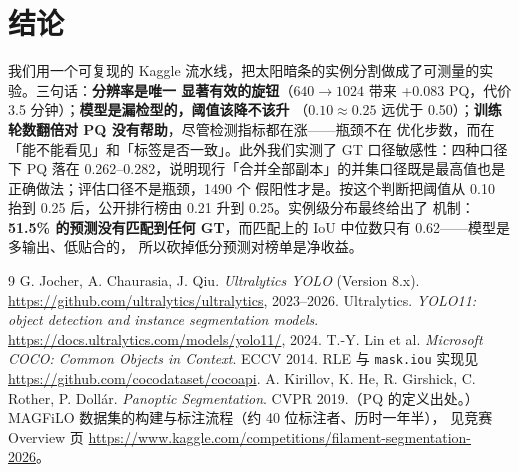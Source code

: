 \documentclass{article}
\begin{document}
\section{结论}
我们用一个可复现的 Kaggle 流水线，把太阳暗条的实例分割做成了可测量的实验。三句话：\textbf{分辨率是唯一
显著有效的旋钮}（$640\to1024$ 带来 +0.083 PQ，代价 3.5 分钟）；\textbf{模型是漏检型的，阈值该降不该升}
（$0.10\approx0.25$ 远优于 0.50）；\textbf{训练轮数翻倍对 PQ 没有帮助}，尽管检测指标都在涨——瓶颈不在
优化步数，而在「能不能看见」和「标签是否一致」。此外我们实测了 GT 口径敏感性：四种口径下 PQ 落在
0.262--0.282，说明现行「合并全部副本」的并集口径既是最高值也是正确做法；评估口径不是瓶颈，1490 个
假阳性才是。按这个判断把阈值从 0.10 抬到 0.25 后，公开排行榜由 0.21 升到 0.25。实例级分布最终给出了
机制：\textbf{51.5\% 的预测没有匹配到任何 GT}，而匹配上的 IoU 中位数只有 0.62——模型是多输出、低贴合的，
所以砍掉低分预测对榜单是净收益。

\begin{thebibliography}{9}
 G. Jocher, A. Chaurasia, J. Qiu. \emph{Ultralytics YOLO} (Version 8.x).
  \url{https://github.com/ultralytics/ultralytics}, 2023--2026.
 Ultralytics. \emph{YOLO11: object detection and instance segmentation models}.
  \url{https://docs.ultralytics.com/models/yolo11/}, 2024.
 T.-Y. Lin et al. \emph{Microsoft COCO: Common Objects in Context}.
  ECCV 2014. RLE 与 \texttt{mask.iou} 实现见 \url{https://github.com/cocodataset/cocoapi}.
 A. Kirillov, K. He, R. Girshick, C. Rother, P. Doll\'ar.
  \emph{Panoptic Segmentation}. CVPR 2019.（PQ 的定义出处。）
 MAGFiLO 数据集的构建与标注流程（约 40 位标注者、历时一年半），
  见竞赛 Overview 页 \url{https://www.kaggle.com/competitions/filament-segmentation-2026}。
\end{thebibliography}

\appendix
\end{document}
